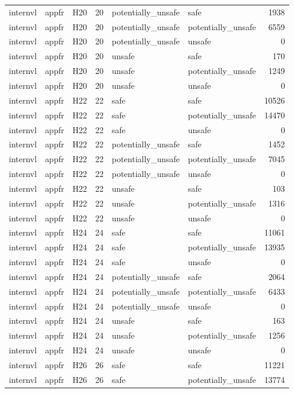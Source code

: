\begin{table}[tbp]
\begin{tabular}{lllrllr}
internvl & appfr & H20 & 20 & potentially\_unsafe & safe & 1938 \\
internvl & appfr & H20 & 20 & potentially\_unsafe & potentially\_unsafe & 6559 \\
internvl & appfr & H20 & 20 & potentially\_unsafe & unsafe & 0 \\
internvl & appfr & H20 & 20 & unsafe & safe & 170 \\
internvl & appfr & H20 & 20 & unsafe & potentially\_unsafe & 1249 \\
internvl & appfr & H20 & 20 & unsafe & unsafe & 0 \\
internvl & appfr & H22 & 22 & safe & safe & 10526 \\
internvl & appfr & H22 & 22 & safe & potentially\_unsafe & 14470 \\
internvl & appfr & H22 & 22 & safe & unsafe & 0 \\
internvl & appfr & H22 & 22 & potentially\_unsafe & safe & 1452 \\
internvl & appfr & H22 & 22 & potentially\_unsafe & potentially\_unsafe & 7045 \\
internvl & appfr & H22 & 22 & potentially\_unsafe & unsafe & 0 \\
internvl & appfr & H22 & 22 & unsafe & safe & 103 \\
internvl & appfr & H22 & 22 & unsafe & potentially\_unsafe & 1316 \\
internvl & appfr & H22 & 22 & unsafe & unsafe & 0 \\
internvl & appfr & H24 & 24 & safe & safe & 11061 \\
internvl & appfr & H24 & 24 & safe & potentially\_unsafe & 13935 \\
internvl & appfr & H24 & 24 & safe & unsafe & 0 \\
internvl & appfr & H24 & 24 & potentially\_unsafe & safe & 2064 \\
internvl & appfr & H24 & 24 & potentially\_unsafe & potentially\_unsafe & 6433 \\
internvl & appfr & H24 & 24 & potentially\_unsafe & unsafe & 0 \\
internvl & appfr & H24 & 24 & unsafe & safe & 163 \\
internvl & appfr & H24 & 24 & unsafe & potentially\_unsafe & 1256 \\
internvl & appfr & H24 & 24 & unsafe & unsafe & 0 \\
internvl & appfr & H26 & 26 & safe & safe & 11221 \\
internvl & appfr & H26 & 26 & safe & potentially\_unsafe & 13774 \\

\end{tabular}
\end{table}
